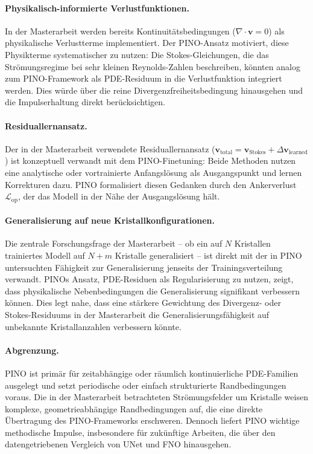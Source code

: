 \documentclass[a4paper,12pt]{article}
\begin{document}
\paragraph{Physikalisch-informierte Verlustfunktionen.}
In der Masterarbeit werden bereits Kontinuitätsbedingungen ($\nabla \cdot \mathbf{v} = 0$)
als physikalische Verlustterme implementiert. Der PINO-Ansatz motiviert, diese
Physikterme systematischer zu nutzen: Die Stokes-Gleichungen, die das
Strömungsregime bei sehr kleinen Reynolds-Zahlen beschreiben, könnten analog zum
PINO-Framework als PDE-Residuum in die Verlustfunktion integriert werden. Dies würde
über die reine Divergenzfreiheitsbedingung hinausgehen und die Impulserhaltung direkt
berücksichtigen.

\paragraph{Residuallernansatz.}
Der in der Masterarbeit verwendete Residuallernansatz ($\mathbf{v}_{\mathrm{total}} =
\mathbf{v}_{\mathrm{Stokes}} + \Delta\mathbf{v}_{\mathrm{learned}}$) ist konzeptuell
verwandt mit dem PINO-Finetuning: Beide Methoden nutzen eine analytische oder
vortrainierte Anfangslösung als Ausgangspunkt und lernen Korrekturen dazu. PINO
formalisiert diesen Gedanken durch den Ankerverlust $\mathcal{L}_{\mathrm{op}}$, der
das Modell in der Nähe der Ausgangslösung hält.

\paragraph{Generalisierung auf neue Kristallkonfigurationen.}
Die zentrale Forschungsfrage der Masterarbeit -- ob ein auf $N$ Kristallen trainiertes
Modell auf $N{+}m$ Kristalle generalisiert -- ist direkt mit der in PINO untersuchten
Fähigkeit zur Generalisierung jenseits der Trainingsverteilung verwandt. PINOs Ansatz,
PDE-Residuen als Regularisierung zu nutzen, zeigt, dass physikalische Nebenbedingungen
die Generalisierung signifikant verbessern können. Dies legt nahe, dass eine stärkere
Gewichtung des Divergenz- oder Stokes-Residuums in der Masterarbeit die
Generalisierungsfähigkeit auf unbekannte Kristallanzahlen verbessern könnte.

\paragraph{Abgrenzung.}
PINO ist primär für zeitabhängige oder räumlich kontinuierliche PDE-Familien ausgelegt
und setzt periodische oder einfach strukturierte Randbedingungen voraus. Die in der
Masterarbeit betrachteten Strömungsfelder um Kristalle weisen komplexe,
geometrieabhängige Randbedingungen auf, die eine direkte Übertragung des PINO-Frameworks
erschweren. Dennoch liefert PINO wichtige methodische Impulse, insbesondere für zukünftige
Arbeiten, die über den datengetriebenen Vergleich von UNet und FNO hinausgehen.
\end{document}
